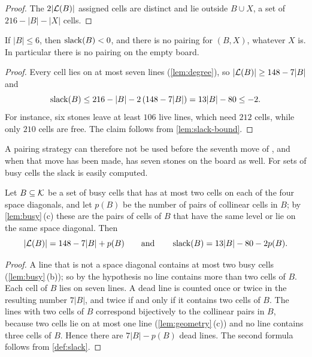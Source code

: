 \begin{proof}
The $2|\mathcal{L}(B)|$ assigned cells are distinct and lie outside $B\cup X$, a set of $216-|B|-|X|$ cells.
\end{proof}

\begin{proposition}\label{prop:seven}
If $|B|\le 6$, then $\operatorname{slack}(B)<0$, and there is no pairing for $(B,X)$, whatever $X$ is. In particular
there is no pairing on the empty board.
\end{proposition}

\begin{proof}
Every cell lies on at most seven lines (\cref{lem:degree}), so $|\mathcal{L}(B)|\ge 148-7|B|$ and
\[
  \operatorname{slack}(B)\le 216-|B|-2\,(148-7|B|)=13|B|-80\le -2 .
\]
For instance, six stones leave at least $106$ live lines, which need $212$ cells, while only $210$ cells
are free. The claim follows from \cref{lem:slack-bound}.
\end{proof}

A pairing strategy can therefore not be used before the seventh move of \Breaker, and when that move has
been made, \Maker{} has seven stones on the board as well. For sets of busy cells the slack is easily computed.

\begin{lemma}\label{lem:busy-slack}
Let $B\subseteq\mathcal{K}$ be a set of busy cells that has at most two cells on each of the four space
diagonals, and let $p(B)$ be the number of pairs of collinear cells in $B$; by \cref{lem:busy}\,\textup{(c)}
these are the pairs of cells of $B$ that have the same level or lie on the same space diagonal. Then
\[
  |\mathcal{L}(B)|=148-7|B|+p(B)\qquad\text{and}\qquad \operatorname{slack}(B)=13|B|-80-2p(B).
\]
\end{lemma}

\begin{proof}
A line that is not a space diagonal contains at most two busy cells (\cref{lem:busy}\,(b)); so by the
hypothesis no line contains more than two cells of $B$. Each cell of $B$ lies on seven lines. A dead line
is counted once or twice in the resulting number $7|B|$, and twice if and only if it contains two cells
of $B$. The lines with two cells of $B$ correspond bijectively to the collinear pairs in $B$, because
two cells lie on at most one line (\cref{lem:geometry}\,(c)) and no line contains three cells of $B$.
Hence there are $7|B|-p(B)$ dead lines. The second formula follows from \cref{def:slack}.
\end{proof}

